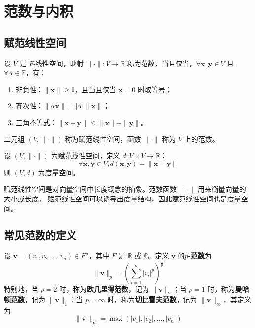 \section{范数与内积}

\subsection{赋范线性空间}

\begin{definition}
    设 $ V $ 是 $F$-线性空间，映射 $ \|\cdot\|:V\to \mathbb{R} $ 称为范数，当且仅当，$ \forall \mathbf{x},\mathbf{y}\in V $ 且 $ \forall \alpha\in \mathbb{F} $，有：
    \begin{enumerate}
        \item 非负性：$ \|\mathbf{x}\|\geq 0 $，且当且仅当 $ \mathbf{x}=0 $ 时取等号；
        \item 齐次性：$ \|\alpha \mathbf{x}\|=|\alpha|\|\mathbf{x}\| $；
        \item 三角不等式：$ \|\mathbf{x}+\mathbf{y}\| \leq \|\mathbf{x}\|+\|\mathbf{y}\| $。
    \end{enumerate}
    二元组 $ (V,\|\cdot\|) $ 称为赋范线性空间，函数 $ \|\cdot\| $ 称为 $ V $ 上的范数。
    \label{def:normed_linear_space}
\end{definition}

\begin{proposition}[赋范线性空间诱导的度量]
    设 $ (V,\|\cdot\|) $ 为赋范线性空间，定义 $ d:V\times V\to \mathbb{R} $：
    \[
        \forall \mathbf{x},\mathbf{y}\in V, d(\mathbf{x},\mathbf{y})=\|\mathbf{x}-\mathbf{y}\| 
    \]
    则 $ (V,d) $ 为度量空间。
\end{proposition}

\begin{note}
    赋范线性空间是对向量空间中长度概念的抽象。范数函数 $ \|\cdot\| $ 用来衡量向量的大小或长度。
    赋范线性空间可以诱导出度量结构，因此赋范线性空间也是度量空间。
\end{note}

\vspace{1em}
\subsection{常见范数的定义}

\begin{definition}[$p$-范数 $p$-Norm]
    设 $ \mathbf{v}=(v_1,v_2,\ldots,v_n)\in F^n $，其中 $F$ 是 $\mathbb{R}$ 或 $\mathbb{C}$。定义 $ \mathbf{v} $ 的\textbf{$p$-范数}为
    \[
        \|\mathbf{v}\|_p = \left( \sum_{i=1}^{n} |v_i|^p \right)^{\frac{1}{p}}
    \]
    特别地，当 $ p=2 $ 时，称为\textbf{欧几里得范数}，记为 $\|\mathbf{v}\|_2$；当 $ p=1 $ 时，称为\textbf{曼哈顿范数}，记为 $\|\mathbf{v}\|_1$；当 $ p=\infty $ 时，称为\textbf{切比雪夫范数}，记为 $\|\mathbf{v}\|_\infty$，其定义为
    \[
        \|\mathbf{v}\|_\infty = \max(|v_1|,|v_2|,\ldots,|v_n|)
    \]
    \label{def:p-norm}
\end{definition}

